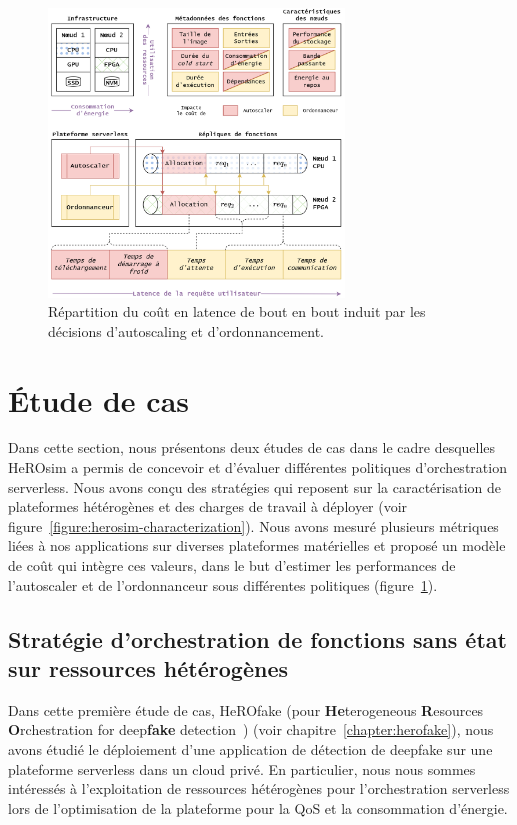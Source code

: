 \begin{figure}[!ht]
    \centering
    \includegraphics[width=0.7\textwidth]{6_Chapitre6/figures/serverless-cost.png}
    \caption{Répartition du coût en latence de bout en bout induit par les décisions d'autoscaling et d'ordonnancement.}
\label{figure:herosim-cost}
\end{figure}

\section{Étude de cas}
\label{section:herosim-case-study}


Dans cette section, nous présentons deux études de cas dans le cadre desquelles HeROsim a permis de concevoir et d'évaluer différentes politiques d'orchestration serverless. Nous avons conçu des stratégies qui reposent sur la caractérisation de plateformes hétérogènes et des charges de travail à déployer (voir figure~\ref{figure:herosim-characterization}). Nous avons mesuré plusieurs métriques liées à nos applications sur diverses plateformes matérielles et proposé un modèle de coût qui intègre ces valeurs, dans le but d'estimer les performances de l'autoscaler et de l'ordonnanceur sous différentes politiques (figure~\ref{figure:herosim-cost}).

\subsection{Stratégie d'orchestration de fonctions sans état sur ressources hétérogènes}

Dans cette première étude de cas, HeROfake (pour \textbf{He}terogeneous \textbf{R}esources \textbf{O}rchestration for deep\textbf{fake} detection~\cite{herofake}) (voir chapitre~\ref{chapter:herofake}), nous avons étudié le déploiement d'une application de détection de deepfake sur une plateforme serverless dans un cloud privé. En particulier, nous nous sommes intéressés à l'exploitation de ressources hétérogènes pour l'orchestration serverless lors de l'optimisation de la plateforme pour la \gls{QoS} et la consommation d'énergie.


